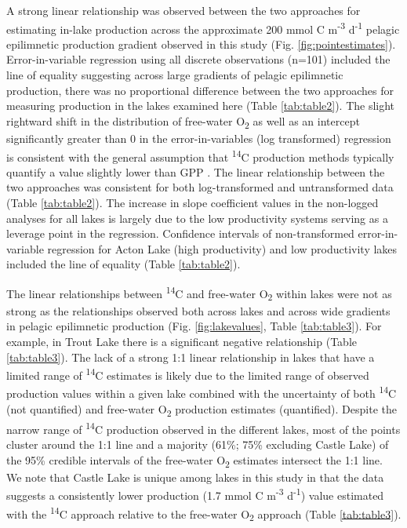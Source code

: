 \documentclass[12pt, oneside]{article}
\begin{document}
A strong linear relationship was observed between the two approaches for estimating in-lake production across the approximate 200 mmol C m\textsuperscript{-3} d\textsuperscript{-1} pelagic epilimnetic production gradient observed in this study (Fig. \ref{fig:pointestimates}). Error-in-variable regression using all discrete observations (n=101) included the line of equality suggesting across large gradients of pelagic epilimnetic production, there was no proportional difference between the two approaches for measuring production in the lakes examined here (Table \ref{tab:table2}). The slight rightward shift in the distribution of free-water O\textsubscript{2} as well as an intercept significantly greater than 0 in the error-in-variables (log transformed) regression is consistent with the general assumption that \textsuperscript{14}C production methods typically quantify a value slightly lower than GPP \citep{peterson_aquatic_1980,hall_measuring_2007}. The linear relationship between the two approaches was consistent for both log-transformed and untransformed data (Table \ref{tab:table2}). The increase in slope coefficient values in the non-logged analyses for all lakes is largely due to the low productivity systems serving as a leverage point in the regression. Confidence intervals of non-transformed error-in-variable regression for Acton Lake (high productivity) and low productivity lakes included the line of equality (Table \ref{tab:table2}).

The linear relationships between \textsuperscript{14}C and free-water O\textsubscript{2} within lakes were not as strong as the relationships observed both across lakes and across wide gradients in pelagic epilimnetic production (Fig. \ref{fig:lakevalues}, Table \ref{tab:table3}). For example, in Trout Lake there is a significant negative relationship (Table \ref{tab:table3}). The lack of a strong 1:1 linear relationship in lakes that have a limited range of \textsuperscript{14}C estimates is likely due to the limited range of observed production values within a given lake combined with the uncertainty of both \textsuperscript{14}C (not quantified) and free-water O\textsubscript{2} production estimates (quantified). Despite the narrow range of \textsuperscript{14}C production observed in the different lakes, most of the points cluster around the 1:1 line and a majority (61\%; 75\% excluding Castle Lake) of the 95\% credible intervals of the free-water O\textsubscript{2} estimates intersect the 1:1 line. We note that Castle Lake is unique among lakes in this study in that the data suggests a consistently lower production (1.7 mmol C m\textsuperscript{-3} d\textsuperscript{-1}) value estimated with the \textsuperscript{14}C approach relative to the free-water O\textsubscript{2} approach (Table \ref{tab:table3}).
\end{document}
